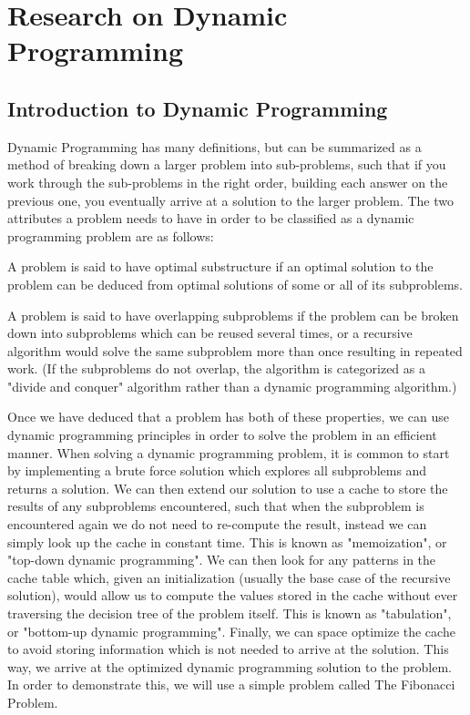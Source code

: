 \chapter{Research on Dynamic Programming}

\section{Introduction to Dynamic Programming}
Dynamic Programming has many definitions, but can be summarized as a method of breaking down a larger problem into sub-problems, such that if you work through the sub-problems in the right order, building each answer on the previous one, you eventually arrive at a solution to the larger problem.
The two attributes a problem needs to have in order to be classified as a dynamic programming problem are as follows:

\begin{definition}
    A problem is said to have optimal substructure if an optimal solution to the problem can be deduced from optimal solutions of some or all of its subproblems.
\end{definition}

\begin{definition}
    A problem is said to have overlapping subproblems if the problem can be broken down into subproblems which can be reused several times, or a recursive algorithm would solve the same subproblem more than once resulting in repeated work. (If the subproblems do not overlap, the algorithm is categorized as a "divide and conquer" algorithm rather than a dynamic programming algorithm.)
\end{definition} 
Once we have deduced that a problem has both of these properties, we can use dynamic programming principles in order to solve the problem in an efficient manner.
When solving a dynamic programming problem, it is common to start by implementing a brute force solution which explores all subproblems and returns a solution.
We can then extend our solution to use a cache to store the results of any subproblems encountered, such that when the subproblem is encountered again we do not need to re-compute the result, instead we can simply look up the cache in constant time.
This is known as "memoization", or "top-down dynamic programming".
We can then look for any patterns in the cache table which, given an initialization (usually the base case of the recursive solution), would allow us to compute the values stored in the cache without ever traversing the decision tree of the problem itself.
This is known as "tabulation", or "bottom-up dynamic programming".
Finally, we can space optimize the cache to avoid storing information which is not needed to arrive at the solution.
This way, we arrive at the optimized dynamic programming solution to the problem.
In order to demonstrate this, we will use a simple problem called The Fibonacci Problem.

